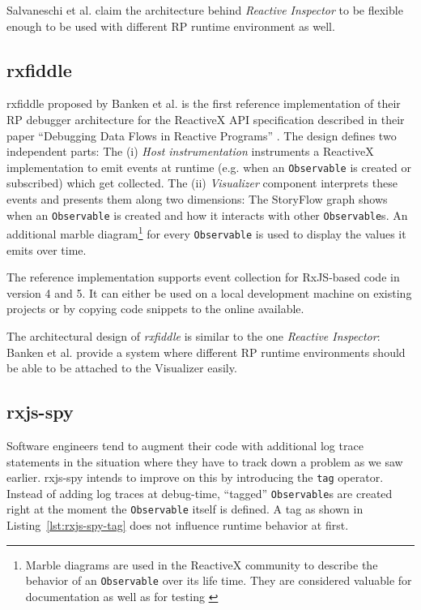 \documentclass[12pt,a4paper]{article}
\begin{document}
Salvaneschi et al. claim\cite{10.1145/2577080.2577083} the architecture behind \emph{Reactive Inspector} to be flexible enough to be used with different RP runtime environment as well.

\subsection{rxfiddle}

rxfiddle proposed by Banken et al. is the first reference implementation of their RP debugger architecture for the ReactiveX API specification described in their paper ``Debugging Data Flows in Reactive Programs'' \cite{10.1145/3180155.3180156}. The design defines two independent parts: The (i) \emph{Host instrumentation} instruments a ReactiveX implementation to emit events at runtime (e.g. when an \texttt{Observable} is created or subscribed) which get collected. The (ii) \emph{Visualizer} component interprets these events and presents them along two dimensions: The StoryFlow graph \cite{YWu2013a} shows when an \texttt{Observable} is created and how it interacts with other \texttt{Observable}s. An additional marble diagram\footnote{Marble diagrams are used in the ReactiveX community to describe the behavior of an \texttt{Observable} over its life time. They are considered valuable for documentation \cite{marblediagrams} as well as for testing \cite{marbletesting}} for every \texttt{Observable} is used to display the values it emits over time.

The reference implementation supports event collection for RxJS-based code in version 4 and 5. It can either be used on a local development machine on existing projects or by copying code snippets to the online available.

The architectural design of \emph{rxfiddle} is similar to the one \emph{Reactive Inspector}: Banken et al. provide a system where different RP runtime environments should be able to be attached to the Visualizer easily.


\subsection{rxjs-spy}

Software engineers tend to augment their code with additional log trace statements in the situation where they have to track down a problem as we saw earlier. rxjs-spy\cite{rxjsspy} intends to improve on this by introducing the \texttt{tag} operator. Instead of adding log traces at debug-time, ``tagged'' \texttt{Observable}s are created right at the moment the \texttt{Observable} itself is defined. A tag as shown in Listing~\ref{lst:rxjs-spy-tag} does not influence runtime behavior at first.
\end{document}
